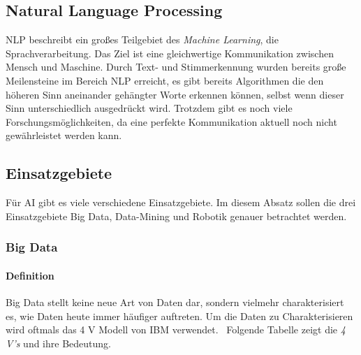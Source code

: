 \subsection{Natural Language Processing}
NLP beschreibt ein großes Teilgebiet des \textit{Machine Learning}, die Sprachverarbeitung. Das Ziel ist eine gleichwertige Kommunikation zwischen Mensch und Maschine. Durch Text- und Stimmerkennung wurden bereits große Meilensteine im Bereich NLP erreicht, es gibt bereits Algorithmen die den höheren Sinn aneinander gehängter Worte erkennen können, selbst wenn dieser Sinn unterschiedlich ausgedrückt wird. Trotzdem gibt es noch viele Forschungsmöglichkeiten, da eine perfekte Kommunikation aktuell noch nicht gewährleistet werden kann.

\subsection{Einsatzgebiete}

Für AI gibt es viele verschiedene Einsatzgebiete. Im diesem Absatz sollen die drei Einsatzgebiete Big Data, Data-Mining und Robotik genauer betrachtet werden.

\subsubsection{Big Data}
\label{bigD}
\paragraph{Definition}
Big Data stellt keine neue Art von Daten dar, sondern vielmehr charakterisiert es, wie Daten heute immer häufiger auftreten. Um die Daten zu Charakterisieren wird oftmals das 4 V Modell von IBM verwendet.~\cite{F_BigData_3.3.5.1} Folgende Tabelle zeigt die \textit{4 V's} und ihre Bedeutung.

